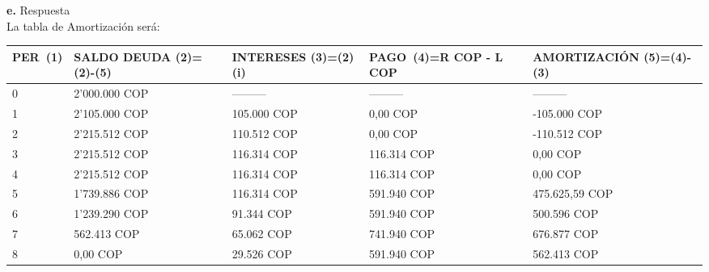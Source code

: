 \textbf{e.}	Respuesta\\
	La tabla de Amortización será: \\
	\begin{spacing}{1.1}
		\begin{center}
			\begin{tabular}{|p{1cm}|p{2.5cm}|p{2.5cm}|p{2cm}|p{3cm}|}
				\hline
				\textbf{PER\ (1)} & \textbf{SALDO DEUDA (2)=(2)-(5)} & \textbf{INTERESES  (3)=(2)(i)} & \textbf{PAGO\ (4)=R  COP  -  L  COP} & \textbf{AMORTIZACIÓN  (5)=(4)-(3)} \\ \hline
				
				0                 &  2'000.000 COP                      & ---------                       & ---------                       & ---------                          \\ \hline
				1                 &  2'105.000  COP                      &  105.000  COP                   &  0,00  COP                    &    -105.000  COP                    \\ \hline
				2                 &  2'215.512  COP                      &  110.512  COP                   &  0,00  COP                    &    -110.512  COP                   \\ \hline
				3                 &  2'215.512  COP                      &  116.314  COP                  &  116.314  COP                  &    0,00  COP                           \\ \hline
				4                 &  2'215.512  COP                      &  116.314  COP                  &  116.314  COP                  &    0,00  COP                           \\ \hline
				5                 &  1'739.886  COP                       &  116.314  COP                  &  591.940  COP                 &    475.625,59   COP                    \\ \hline
				6                 &  1'239.290  COP                       &  91.344  COP                   &  591.940  COP                 &    500.596  COP                     \\ \hline
				7                 &  562.413  COP                        &   65.062  COP                   &  741.940  COP                 &    676.877   COP                   \\ \hline
				8                 &  0,00  COP                           &  29.526  COP                &    591.940  COP                   &    562.413   COP                    \\ \hline
			\end{tabular}
		\end{center}
	\end{spacing}

